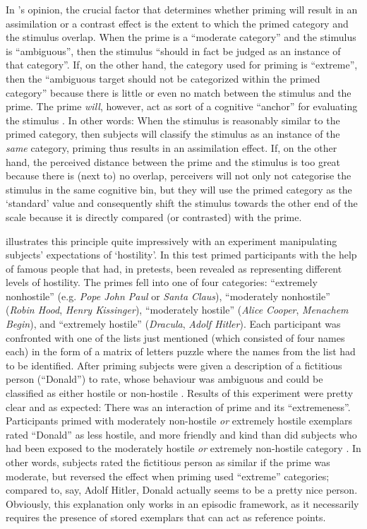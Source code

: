 In \citeauthor{herr1986}'s opinion, the crucial factor that determines whether priming will result in an assimilation or a contrast effect is the extent to which the primed category and the stimulus overlap.
When the prime is a ``moderate category'' and the stimulus is ``ambiguous'', then the stimulus ``should in fact be judged as an instance of that category''.
If, on the other hand, the category used for priming is ``extreme'', then the ``ambiguous target should not be categorized within the primed category'' because there is little or even no match between the stimulus and the prime.
The prime \emph{will}, however, act as sort of a cognitive ``anchor'' for evaluating the stimulus \parencite[cf.][1107]{herr1986}.
In other words: When the stimulus is reasonably similar to the primed category, then subjects will classify the stimulus as an instance of the \emph{same} category, priming thus results in an assimilation effect.
If, on the other hand, the perceived distance between the prime and the stimulus is too great because there is (next to) no overlap, perceivers will not only not categorise the stimulus in the same cognitive bin, but they will use the primed category as the `standard' value and consequently shift the stimulus towards the other end of the scale because it is directly compared (or contrasted) with the prime.

\citeauthor{herr1986} illustrates this principle quite impressively with an experiment manipulating subjects' expectations of `hostility'.
In this test \citeauthor{herr1986} primed participants with the help of famous people that had, in pretests, been revealed as representing different levels of hostility.
The primes fell into one of four categories: ``extremely nonhostile'' (e.g. \emph{Pope John Paul} or \emph{Santa Claus}), ``moderately nonhostile'' (\emph{Robin Hood}, \emph{Henry Kissinger}), ``moderately hostile'' (\emph{Alice Cooper}, \emph{Menachem Begin}), and ``extremely hostile'' (\emph{Dracula}, \emph{Adolf Hitler}).
Each participant was confronted with one of the lists just mentioned (which consisted of four names each) in the form of a matrix of letters puzzle where the names from the list had to be identified.
After priming subjects were given a description of a fictitious person (``Donald'') to rate, whose behaviour was ambiguous and could be classified as either hostile or non-hostile \parencite[cf.][1108]{herr1986}.
Results of this experiment were pretty clear and as expected: There was an interaction of prime and its ``extremeness''.
Participants primed with moderately non-hostile \emph{or} extremely hostile exemplars rated ``Donald'' as less hostile, and more friendly and kind than did subjects who had been exposed to the moderately hostile \emph{or} extremely non-hostile category \parencite[cf.][1109]{herr1986}.
In other words, subjects rated the fictitious person as similar if the prime was moderate, but reversed the effect when priming used ``extreme'' categories; compared to, say, Adolf Hitler, Donald actually seems to be a pretty nice person.
Obviously, this explanation only works in an episodic framework, as it necessarily requires the presence of stored exemplars that can act as reference points.

